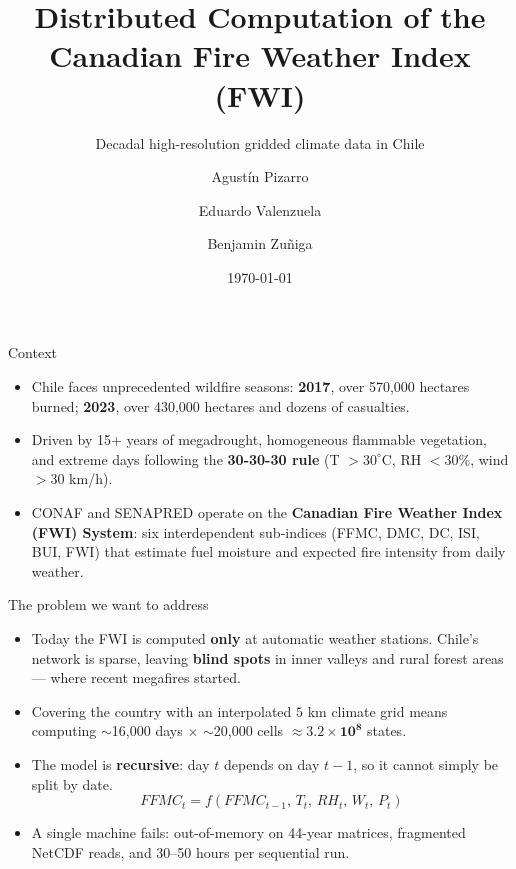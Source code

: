 \documentclass[11pt,aspectratio=169]{beamer}
\title[Distributed FWI over Chile]{Distributed Computation of the Canadian Fire Weather Index (FWI)}
\subtitle{Decadal high-resolution gridded climate data in Chile}
\author[Group Members]{Agustín Pizarro \and Eduardo Valenzuela \and Benjamin Zuñiga}
\institute[UDP]{Big Data Processing Systems --- Universidad Diego Portales \\ \small Instructor: Nicolás Hidalgo}
\date{\today}
\begin{document}
\begin{frame}[plain]
  \titlepage
\end{frame}

\begin{frame}{Context}
  \begin{itemize}
    \item Chile faces unprecedented wildfire seasons: \textbf{2017}, over 570,000 hectares burned;
          \textbf{2023}, over 430,000 hectares and dozens of casualties.
    \item Driven by 15+ years of megadrought, homogeneous flammable vegetation, and extreme days
          following the \textbf{30-30-30 rule} (T $>30^\circ$C, RH $<30\%$, wind $>30$ km/h).
    \item CONAF and SENAPRED operate on the \textbf{Canadian Fire Weather Index (FWI) System}:
          six interdependent sub-indices (FFMC, DMC, DC, ISI, BUI, FWI) that estimate fuel moisture
          and expected fire intensity from daily weather.
  \end{itemize}
\end{frame}

\begin{frame}{The problem we want to address}
  \begin{itemize}
    \item Today the FWI is computed \textbf{only} at automatic weather stations. Chile's network is sparse,
          leaving \textbf{blind spots} in inner valleys and rural forest areas --- where recent megafires started.
    \item Covering the country with an interpolated $5$ km climate grid means computing
          $\sim$16,000 days $\times$ $\sim$20,000 cells $\approx \mathbf{3.2 \times 10^{8}}$ states.
    \item The model is \textbf{recursive}: day $t$ depends on day $t-1$, so it cannot simply be split by date.
      \[ FFMC_t = f(FFMC_{t-1},\, T_t,\, RH_t,\, W_t,\, P_t) \]
    \item A single machine fails: out-of-memory on 44-year matrices, fragmented NetCDF reads,
          and 30--50 hours per sequential run.
  \end{itemize}
\end{frame}
\end{document}
